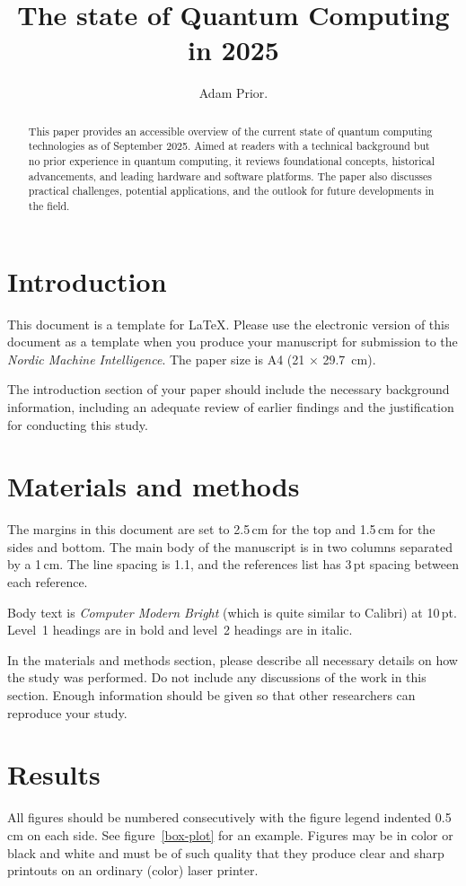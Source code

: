 \documentclass{elbioimp2}
\title{The state of Quantum Computing in 2025}
\author{Adam Prior.\affiliation{UrbanFox, Dublin, Ireland}}
\begin{document}
\maketitle

\begin{abstract}
  This paper provides an accessible overview of the current state of quantum computing technologies
  as of September 2025. Aimed at readers with a technical background but no prior experience in quantum
  computing, it reviews foundational concepts, historical advancements, and leading hardware and software platforms. The paper
  also discusses practical challenges, potential applications, and the outlook for future developments in the field.

\end{abstract}

\section{Introduction}
This document is a template for \LaTeX. 
Please use the electronic version of this document as a
template when you produce your manuscript for submission to the
\emph{Nordic Machine Intelligence}. The paper size is A4 (21 × 
29.7~cm).

The introduction section of your paper should include the necessary
background information, including an adequate review of earlier
findings and the justification for conducting this study.

\section{Materials and methods}
The margins in this document are set to 2.5\,cm for the top and 1.5\,cm
for the sides and bottom. The main body of the manuscript is in two
columns separated by a 1\,cm. The line spacing is 1.1, and the
references list has 3\,pt spacing between each reference.

Body text is \emph{Computer Modern Bright} (which is quite similar to
Calibri) at 10\,pt. Level~1 headings are in bold and level~2
headings are in italic.

In the materials and methods section, please describe all necessary
details on how the study was performed. Do not
include any discussions of the work in this section. Enough
information should be given so that other researchers can reproduce
your study.


\section{Results}
All figures should be numbered consecutively with the figure legend
indented 0.5\,cm on each side. See figure~\ref{box-plot} for an example.
Figures may be in color or black and white and must be of such quality
that they produce clear and sharp printouts on an ordinary (color)
laser printer.
\end{document}
